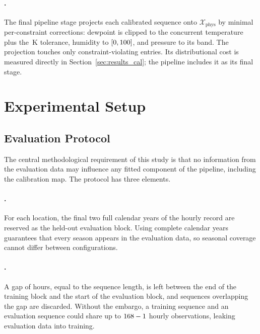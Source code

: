 \documentclass[preprint,12pt]{elsarticle}
\makeatletter
\let\ElsParagraph\paragraph
\def\StripRunInStop#1.\StripRunInMark#2\StripRunInEnd{#1}
\let\StripRunInMark\@empty
\renewcommand\paragraph[1]{\ElsParagraph{\StripRunInStop#1\StripRunInMark.\StripRunInMark\StripRunInEnd}}
\makeatother
\begin{document}
\paragraph{Constraint projection.}
The final pipeline stage projects each calibrated sequence onto
$\mathcal{X}_{\mathrm{phys}}$ by minimal per-constraint corrections:
dewpoint is clipped to the concurrent temperature plus the
\protoDewTol\,K tolerance, humidity to $[0, 100]$, and
pressure to its band.  The
projection touches only constraint-violating entries.  Its distributional cost is measured directly in
Section~\ref{sec:results_cal}; the pipeline includes it as its final
stage.

\section{Experimental Setup}
\label{sec:setup}

\subsection{Evaluation Protocol}
\label{sec:protocol}

The central methodological requirement of this study is that no
information from the evaluation data may influence any fitted component
of the pipeline, including the calibration map.  The protocol has three
elements.

\paragraph{Temporal held-out split.}
For each location, the final two full calendar years of the hourly
record are reserved as the held-out evaluation block.  Using complete
calendar years guarantees that every season appears in the evaluation
data, so seasonal coverage cannot differ between configurations.

\paragraph{Embargo.}
A gap of \protoEmbargoHours{} hours, equal to the sequence length, is left between the
end of the training block and the start of the evaluation block, and
sequences overlapping the gap are discarded.  Without the embargo, a
training sequence and an evaluation sequence could share up to $168 - 1$ hourly observations, leaking evaluation data into training.
\end{document}
